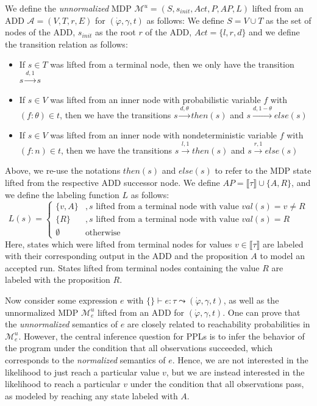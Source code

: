 We define the \textit{unnormalized} MDP $\mathcal{M}^u = (S, s_{init}, \mathit{Act}, P, AP, L)$ lifted from an ADD $\mathcal{A} = (V, T, r, E)$ for $(\dot{\varphi}, \gamma, t)$ as follows: 
We define $S = V \cup T$ as the set of nodes of the ADD, $s_{init}$ as the root $r$ of the ADD, $\mathit{Act} = \{l, r, d\}$ and we define the transition relation as follows:
\begin{itemize}
	\item If $s \in T$ was lifted from a terminal node, then we only have the transition $s\xrightarrow{d, 1} s$
	\item If $s\in V$ was lifted from an inner node with probabilistic variable $f$ with $(f\colon \theta) \in t$, then we have the transitions $s\xrightarrow{d, \theta} \mathit{then}(s)$ and $s\xrightarrow{d, 1 - \theta} \mathit{else}(s)$
	\item If $s\in V$ was lifted from an inner node with nondeterministic variable $f$ with $(f\colon n) \in t$, then we have the transitions $s\xrightarrow{l, 1} \mathit{then}(s)$ and $s\xrightarrow{r, 1} \mathit{else}(s)$
\end{itemize}
Above, we re-use the notations $\mathit{then}(s)$ and $\mathit{else}(s)$ to refer to the MDP state lifted from the respective ADD successor node.
We define $AP = \llbracket\tau \rrbracket \cup \{A, R\}$, and we define the labeling function $L$ as follows:
$$L(s) = \begin{cases}
	\{v, A\} &, \text{$s$ lifted from a terminal node with value $\mathit{val}(s) = v \neq R$}\\
	\{R\} &, \text{$s$ lifted from a terminal node with value $\mathit{val}(s) = R$}\\
	\emptyset & \text{otherwise}
\end{cases}$$
Here, states which were lifted from terminal nodes for values $v\in \llbracket\tau \rrbracket$ are labeled with their corresponding output in the ADD and the proposition $A$ to model an accepted run.
States lifted from terminal nodes containing the value $R$ are labeled with the proposition $R$.

Now consider some \NDICE expression $e$ with $\{\} \vdash e \colon \tau \leadsto (\dot{\varphi}, \gamma, t)$, as well as the unnormalized MDP $\mathcal{M}^u_e$ lifted from an ADD for $(\dot{\varphi}, \gamma, t)$.
One can prove that the \textit{unnormalized} semantics of $e$ are closely related to reachability probabilities in $\mathcal{M}^u_e$.
However, the central inference question for PPLs is to infer the behavior of the program under the condition that all observations succeeded, which corresponds to the \textit{normalized} semantics of $e$.
Hence, we are not interested in the likelihood to just reach a particular value $v$, but we are instead interested in the likelihood to reach a particular $v$ under the condition that all observations pass, as modeled by reaching any state labeled with $A$.

